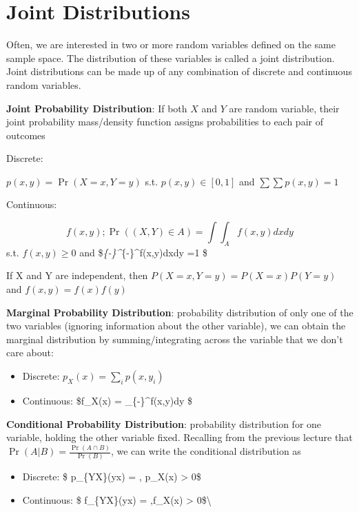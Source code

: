 \documentclass[]{book}
\providecommand{\tightlist}{%
  \setlength{\itemsep}{0pt}\setlength{\parskip}{0pt}}
\theoremstyle{definition}
\theoremstyle{definition}
\theoremstyle{definition}
\theoremstyle{remark}
\begin{document}
\section{Joint Distributions}\label{joint-distributions}

Often, we are interested in two or more random variables defined on the
same sample space. The distribution of these variables is called a joint
distribution. Joint distributions can be made up of any combination of
discrete and continuous random variables.

\textbf{Joint Probability Distribution}: If both \(X\) and \(Y\) are
random variable, their joint probability mass/density function assigns
probabilities to each pair of outcomes

Discrete:

\(p(x, y) = \Pr(X = x, Y = y)\) s.t. \(p(x,y) \in [0,1]\) and
\(\sum\sum p(x,y) = 1\)

Continuous:

\[f(x,y);\Pr((X,Y) \in A) = \int\!\!\!\int_A f(x,y)dx dy \] s.t.
\(f(x,y)\ge 0\) and
\$\int\emph{\{-\infty\}\^{}\infty\int}\{-\infty\}\^{}\infty f(x,y)dxdy
=1 \$

If X and Y are independent, then \(P(X=x,Y=y) = P(X=x)P(Y=y)\) and
\(f(x,y) = f(x)f(y)\)

\textbf{Marginal Probability Distribution}: probability distribution of
only one of the two variables (ignoring information about the other
variable), we can obtain the marginal distribution by
summing/integrating across the variable that we don't care about:

\begin{itemize}
\tightlist
\item
  Discrete: \(p_X(x) = \sum_i p(x, y_i)\)
\item
  Continuous: \$f\_X(x) = \int\_\{-\infty\}\^{}\infty f(x,y)dy \$
\end{itemize}

\textbf{Conditional Probability Distribution}: probability distribution
for one variable, holding the other variable fixed. Recalling from the
previous lecture that \(\Pr(A|B)=\frac{\Pr(A\cap B)}{\Pr(B)}\), we can
write the conditional distribution as

\begin{itemize}
\tightlist
\item
  Discrete: \$ p\_\{Y\textbar{}X\}(y\textbar{}x) =
  , \quad p\_X(x) \textgreater{} 0\$
\item
  Continuous: \$ f\_\{Y\textbar{}X\}(y\textbar{}x) =
  ,\quad f\_X(x) \textgreater{} 0\$\textbackslash{}
\end{itemize}
\end{document}
